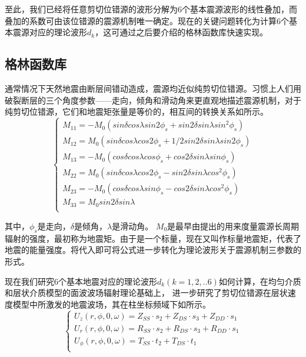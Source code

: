 至此，我们已经将任意剪切位错源的波形分解为6个基本震源波形的线性叠加，而叠加的系数可由该位错源的震源机制唯一确定。现在的关键问题转化为计算6个基本震源对应的理论波形$d_k$，这可通过之后要介绍的格林函数库快速实现。

\subsection{格林函数库}

通常情况下天然地震由断层间错动造成，震源均近似纯剪切位错源。习惯上人们用破裂断层的三个角度参数——走向，倾角和滑动角来更直观地描述震源机制，对于纯剪切位错源，它们和地震矩张量是等价的，相互间的转换关系如所示\citep{Aki1980}。
\begin{equation}
\label{eq2_09}
\left\{
    \begin{array}{l}
    M_{11}=-M_0(sin{\delta}cos{\lambda}sin{2\phi_s}+sin{2\delta}sin{\lambda}sin^2{\phi_s})\\
    M_{12}=M_0(sin{\delta}cos{\lambda}cos{2\phi_s}+1/2sin{2\delta}sin{\lambda}sin{2\phi_s})\\
    M_{13}=-M_0(cos{\delta}cos{\lambda}cos{\phi_s}+cos{2\delta}sin{\lambda}sin{\phi_s})\\
    M_{22}=M_0(sin{\delta}cos{\lambda}cos{2\phi_s}-sin{2\delta}sin{\lambda}cos^2{\phi_s})\\
    M_{23}=-M_0(cos{\delta}cos{\lambda}sin{\phi_s}-cos{2\delta}sin{\lambda}cos^2{\phi_s})\\
    M_{33}=M_0sin{2\delta}sin{\lambda}\\
    \end{array}
\right.
\end{equation}

其中，$\phi_s$是走向，$\delta$是倾角，$\lambda$是滑动角。 $M_0$是最早由\citet{Aki1966}提出的用来度量震源长周期辐射的强度，最初称为地震矩。由于是一个标量，现在又叫作标量地震矩，代表了地震的能量强度。将代入即可将公式进一步转化为理论波形关于震源机制三参数的形式。

现在我们研究6个基本地震对应的理论波形$d_k(k=1,2,..6)$如何计算，在均匀介质\citep{Ben-Menahem1963}和层状介质\citep{Haskell1964}模型的面波波场辐射理论基础上，\citet{Wang1980} 进一步研究了剪切位错源在层状速度模型中所激发的地震波场，其在柱坐标频域下如所示。
\begin{equation}
\label{eq2_10}
\left\{
    \begin{array}{l}
    U_z(r,\phi,0,\omega)=Z_{SS}{\cdot}s_2+Z_{DS}{\cdot}s_3+Z_{DD}{\cdot}s_1\\
    U_r(r,\phi,0,\omega)=R_{SS}{\cdot}s_2+R_{DS}{\cdot}s_3+R_{DD}{\cdot}s_1\\
    U_{\phi}(r,\phi,0,\omega)=T_{SS}{\cdot}t_2+T_{DS}{\cdot}t_1\\
    \end{array}
\right.
\end{equation}

